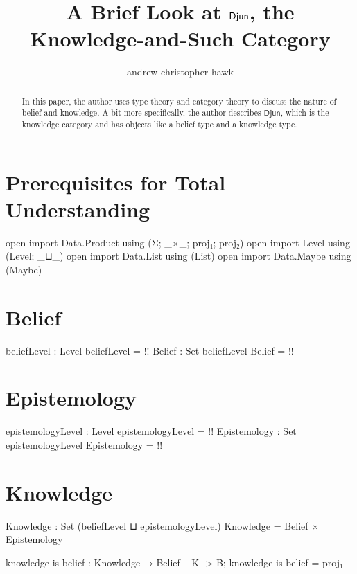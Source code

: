 \documentclass{article}
\title{A Brief Look at \(\category{Djun}\), the Knowledge-and-Such Category}
\author{andrew christopher hawk}
\newcommand{\category}[1]{\mathsf{#1}}
\begin{document}
\maketitle{}

\begin{abstract}
In this paper, the author uses type theory and category theory to discuss the nature of belief and knowledge.  A bit more specifically, the author describes \(\category{Djun}\), which is the knowledge category and has objects like a belief type and a knowledge type.
\end{abstract}

\section{Prerequisites for Total Understanding}

\begin{code}
open import Data.Product using (Σ; _×_; proj₁; proj₂)
open import Level using (Level; _⊔_)
open import Data.List using (List)
open import Data.Maybe using (Maybe)
\end{code}

\section{Belief}

\begin{code}
beliefLevel : Level
beliefLevel = {!!}
Belief : Set beliefLevel
Belief = {!!}
\end{code}

\section{Epistemology}

\begin{code}
epistemologyLevel : Level
epistemologyLevel = {!!}
Epistemology : Set epistemologyLevel
Epistemology = {!!}
\end{code}

\section{Knowledge}

\begin{code}
Knowledge : Set (beliefLevel ⊔ epistemologyLevel)
Knowledge = Belief × Epistemology
\end{code}

\begin{code}
knowledge-is-belief : Knowledge → Belief -- K -> B;
knowledge-is-belief = proj₁
\end{code}
\end{document}
